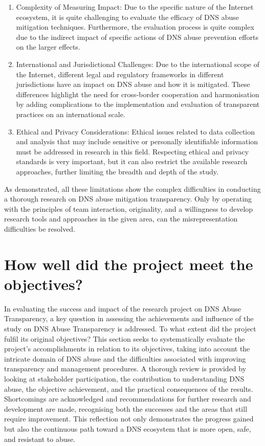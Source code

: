 \begin{enumerate}
    \item Complexity of Measuring Impact: Due to the specific nature of the Internet ecosystem, it is quite challenging to evaluate the efficacy of DNS abuse mitigation techniques. Furthermore, the evaluation process is quite complex due to the indirect impact of specific actions of DNS abuse prevention efforts on the larger effects.

    \item International and Jurisdictional Challenges: Due to the international scope of the Internet, different legal and regulatory frameworks in different jurisdictions have an impact on DNS abuse and how it is mitigated. These differences highlight the need for cross-border cooperation and harmonisation by adding complications to the implementation and evaluation of transparent practices on an international scale.

    \item Ethical and Privacy Considerations: Ethical issues related to data collection and analysis that may include sensitive or personally identifiable information must be addressed in research in this field. Respecting ethical and privacy standards is very important, but it can also restrict the available research approaches, further limiting the breadth and depth of the study.
    
  
\end{enumerate}

As demonstrated, all these limitations show the complex difficulties in conducting a thorough research on DNS abuse mitigation transparency. Only by operating with the principles of team interaction, originality, and a willingness to develop research tools and approaches in the given area, can the misrepresentation difficulties be resolved.

\section{How well did the project meet the objectives?}

In evaluating the success and impact of the research project on DNS Abuse Transparency, a key question in assessing the achievements and influence of the study on DNS Abuse Transparency is addressed. To what extent did the project fulfil its original objectives? This section seeks to systematically evaluate the project's accomplishments in relation to its objectives, taking into account the intricate domain of DNS abuse and the difficulties associated with improving transparency and management procedures. A thorough review is provided by looking at stakeholder participation, the contribution to understanding DNS abuse, the objective achievement, and the practical consequences of the results. Shortcomings are acknowledged and recommendations for further research and development are made, recognising both the successes and the areas that still require improvement. This reflection not only demonstrates the progress gained but also the continuous path toward a DNS ecosystem that is more open, safe, and resistant to abuse.


